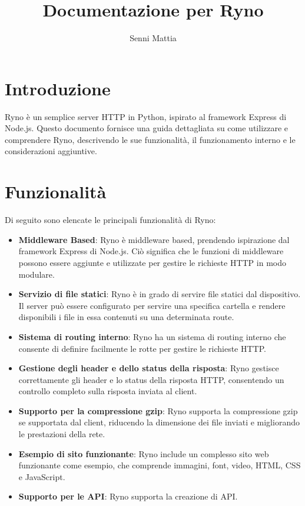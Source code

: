 \documentclass{article}
\begin{document}
\tableofcontents

 
\title{Documentazione per Ryno}
\author{Senni Mattia}
\maketitle

\section{Introduzione}
Ryno è un semplice server HTTP in Python, ispirato al framework Express di Node.js. Questo documento fornisce una guida dettagliata su come utilizzare e comprendere Ryno, descrivendo le sue funzionalità, il funzionamento interno e le considerazioni aggiuntive.

\section{Funzionalità}
Di seguito sono elencate le principali funzionalità di Ryno:

\begin{itemize}
  \item \textbf{Middleware Based}: Ryno è middleware based, prendendo ispirazione dal framework Express di Node.js. Ciò significa che le funzioni di middleware possono essere aggiunte e utilizzate per gestire le richieste HTTP in modo modulare.
  
  \item \textbf{Servizio di file statici}: Ryno è in grado di servire file statici dal dispositivo. Il server può essere configurato per servire una specifica cartella e rendere disponibili i file in essa contenuti su una determinata route.
  
  \item \textbf{Sistema di routing interno}: Ryno ha un sistema di routing interno che consente di definire facilmente le rotte per gestire le richieste HTTP.
  
  \item \textbf{Gestione degli header e dello status della risposta}: Ryno gestisce correttamente gli header e lo status della risposta HTTP, consentendo un controllo completo sulla risposta inviata al client.
  
  \item \textbf{Supporto per la compressione gzip}: Ryno supporta la compressione gzip se supportata dal client, riducendo la dimensione dei file inviati e migliorando le prestazioni della rete.
  
  \item \textbf{Esempio di sito funzionante}: Ryno include un complesso sito web funzionante come esempio, che comprende immagini, font, video, HTML, CSS e JavaScript.
  
  \item \textbf{Supporto per le API}: Ryno supporta la creazione di API.
\end{itemize}
\end{document}
